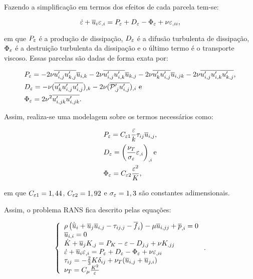 Fazendo a simplificação em termos dos efeitos de cada parcela tem-se:

\begin{equation}
    \dot{\varepsilon}+\overline{u}_i\varepsilon_{,i}=P_\varepsilon+D_\varepsilon-\Phi_\varepsilon+\nu\varepsilon_{,ii}\text{,}
\end{equation}

\noindent em que $P_\varepsilon$ é a produção de dissipação, $D_\varepsilon$ é a difusão turbulenta de dissipação, $\Phi_\varepsilon$ é a destruição turbulenta da dissipação e o último termo é o transporte viscoso. Essas parcelas são dadas de forma exata por:

\begin{subequations}
    \begin{align}
         & P_\varepsilon=-2\nu\overline{u'_{i,j}u'_{k,j}}\overline{u}_{i,k}-2\nu\overline{u'_{i,j}u'_{i,k}}\overline{u}_{k,j}-2\nu\overline{u'_ku'_{i,j}}\overline{u}_{i,jk}-2\nu\overline{u'_{i,j}u'_{i,k}u'_{k,j}} \text{,} \\
         & D_\varepsilon=-\nu(\overline{u'_ku'_{i,j}u'_{i,j}})_{,k}-2\nu(\overline{\mathcal{P}'_{,j}u'_{i,j}})_{,i} \text{ e}                                                                                \\
         & \Phi_\varepsilon=2\nu^2\overline{u'_{i,jk}u'_{i,jk}}\text{.}
    \end{align}
\end{subequations}

Assim, realiza-se uma modelagem sobre os termos necessários como:

\begin{subequations}
    \begin{align}
         & P_\varepsilon=C_{\varepsilon 1}\frac{\varepsilon}{k}\tau_{ij}\overline{u}_{i,j}\text{,}   \\
         & D_\varepsilon=\left({\frac{\nu_T}{\sigma_\varepsilon}\varepsilon_{,i}}\right)_{,i}\text{e} \\
         & \Phi_\varepsilon=C_{\varepsilon 2}\frac{\varepsilon^2}{K}\text{,}
    \end{align}
\end{subequations}

\noindent em que $C_{\varepsilon 1}=1,44$, $C_{\varepsilon 2}=1,92$ e $\sigma_\varepsilon=1,3$ são constantes adimensionais.

Assim, o problema RANS fica descrito pelas equações:

\begin{equation}
    \left\{
    \begin{array}{l}
        \rho\left({\dot{\overline{u}}_i+\overline{u}_j\overline{u}_{i,j}-\tau_{ij,j}-\overline{f}_i}\right)-\mu\overline{u}_{i,jj}+\overline{p}_{,i}=0    \\
        \overline{u}_{i,i}=0                                                                                               \\
        \dot{K}+\overline{u}_jK_{,j}=P_K-\varepsilon-D_{j,j}+\nu K_{,jj}                                                   \\
        \dot{\varepsilon}+\overline{u}_i\varepsilon_{,i}=P_\varepsilon+D_\varepsilon-\Phi_\varepsilon+\nu\varepsilon_{,ii} \\
        \tau_{ij}=-\frac{2}{3}K\delta_{ij}+\nu_T(\overline{u}_{i,j}+\overline{u}_{j,i})                                         \\
        \nu_T=C_\mu\frac{K^2}{\varepsilon}
    \end{array}
    \right.\text{.}
\end{equation}